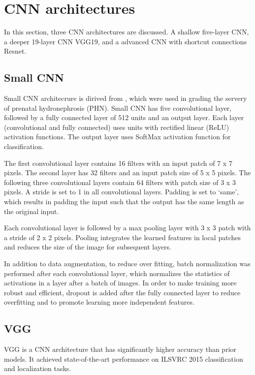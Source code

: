 \chapter{CNN architectures} 

In this section, three CNN architectures are discussed. A shallow five-layer CNN, a deeper 19-layer CNN VGG19, and a advanced CNN with shortcut connections Resnet.

\section{Small CNN}
Small CNN architecrure is dirived from \cite{Dhindsa2018}, which were used in grading the servery of prenatal hydronephrosis (PHN). Small CNN has five convolutional layer, followed by a fully connected layer of 512 units and an output layer. Each layer (convolutional and fully connected) uses units with rectified linear (ReLU) activation functions. The output layer uses SoftMax activation function for classification. 

The first convolutional layer contains 16 filters with an input patch of 7 x 7 pixels. The second layer has 32 filters and an input patch size of 5 x 5 pixels. The following three convolutional layers contain 64 filters with patch size of 3 x 3 pixels. A stride is set to 1 in all convolutional layers. Padding is set to ‘same’, which results in padding the input such that the output has the same length as the original input.

Each convolutional layer is followed by a max pooling layer with 3 x 3 patch with a stride of 2 x 2 pixels. Pooling integrates the learned features in local patches and reduces the size of the image for subsequent layers. 

In addition to data augmentation, to reduce over fitting, batch normalization was performed after each convolutional layer, which normalizes the statistics of activations in a layer after a batch of images. In order to make training more robust and efficient, dropout is added after the fully connected layer to reduce overfitting and to promote learning more independent features.

\section{VGG}
VGG \citep{vgg} is a CNN architecture that has significantly higher accuracy than prior models. It achieved state-of-the-art performance on ILSVRC 2015 classification and localization tasks. 

